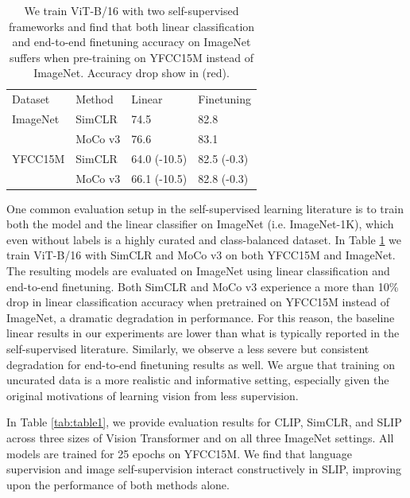 \documentclass[10pt,twocolumn,letterpaper]{article}
\newcommand{\tablestyle}[2]{\setlength{\tabcolsep}{#1}\renewcommand{\arraystretch}{#2}\centering\footnotesize}
\begin{document}
\begin{table}[h]
\tablestyle{2pt}{1.1}
\setlength{\tabcolsep}{4pt}
\begin{tabular}{l l l l }
Dataset & Method & Linear & Finetuning \\
\shline
ImageNet & SimCLR & 74.5 & 82.8 \\
  & MoCo v3 & 76.6 & 83.1 \\
\hline
YFCC15M & SimCLR & 64.0 \color{Red}(-10.5) & 82.5 \color{Red}(-0.3) \\
  & MoCo v3 & 66.1 \color{Red}(-10.5) & 82.8 \color{Red}(-0.3) \\
\end{tabular}
\vspace{-.5em}
\caption{We train ViT-B/16 with two self-supervised frameworks and find that both linear classification and end-to-end finetuning accuracy on ImageNet suffers when pre-training on YFCC15M instead of ImageNet. Accuracy drop show in \color{Red}(red).
}
\label{tab:shift}
\vspace{-.5em}
\end{table}

One common evaluation setup in the self-supervised learning literature is to train both the model and the linear classifier on ImageNet (i.e. ImageNet-1K), which even without labels is a highly curated and class-balanced dataset.
In Table \ref{tab:shift} we train ViT-B/16 with SimCLR and MoCo v3 on both YFCC15M and ImageNet.
The resulting models are evaluated on ImageNet using linear classification and end-to-end finetuning.
Both SimCLR and MoCo v3 experience a more than 10\% drop in linear classification accuracy when pretrained on YFCC15M instead of ImageNet, a dramatic degradation in performance.
For this reason, the baseline linear results in our experiments are lower than what is typically reported in the self-supervised literature. Similarly, we observe a less severe but consistent degradation for end-to-end finetuning results as well.
We argue that training on uncurated data is a more realistic and informative setting, especially given the original motivations of learning vision from less supervision.

In Table \ref{tab:table1}, we provide evaluation results for CLIP, SimCLR, and SLIP across three sizes of Vision Transformer and on all three ImageNet settings.
All models are trained for 25 epochs on YFCC15M.
We find that language supervision and image self-supervision interact constructively in SLIP, improving upon the performance of both methods alone.
\end{document}
